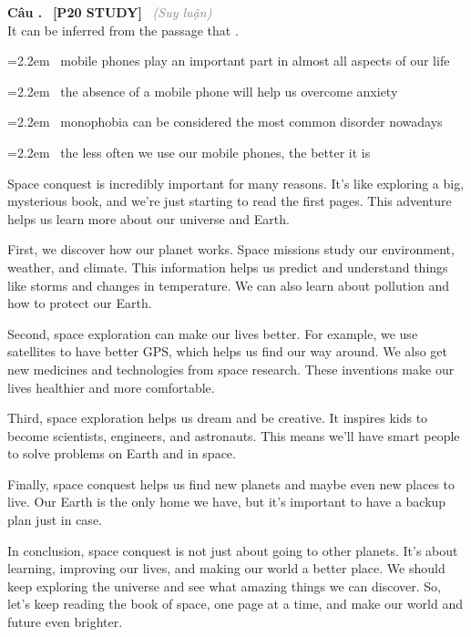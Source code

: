 \documentclass[12pt,a4paper,twoside]{article}
\newcounter{qcounter}
\newcommand{\question}[2][]{%
    \stepcounter{qcounter}%
    \par\vspace{6pt}%
    \noindent\textcolor{primaryBlue}{\textbf{Câu \theqcounter.}}~%
    \textcolor{secondaryBlue}{\small\textbf{[P20 STUDY]}}~%
    \if\relax\detokenize{#1}\relax\else\textcolor{gray}{\small\textit{(#1)}}~\fi\\[1pt]
    \noindent #2%
}
\newcommand{\choiceitem}[2]{%
    \tikz[baseline=-0.5ex]{%
        \node[draw=primaryBlue, circle, minimum size=1.5em, inner sep=0pt, thick] {\textbf{#1}};%
    }~#2%
}
\newenvironment{readingpassage}[1][]{%
    \begin{tcolorbox}[enhanced, colback=grayLight, colframe=secondaryBlue,
        coltitle=textDark, fonttitle=\bfseries, title={#1},
        rounded corners, arc=3mm, boxrule=1pt,
        left=15pt, right=15pt, top=10pt, bottom=10pt,
        breakable, before skip=10pt, after skip=10pt, drop fuzzy shadow]
    \setstretch{1.3}
}{\end{tcolorbox}}
\begin{document}
\question[Suy luận]{It can be inferred from the passage that \underline{\hspace{1.3cm}}.}

\par\vspace{4pt}
\noindent\hangindent=2.2em\choiceitem{A}{mobile phones play an important part in almost all aspects of our life}\par\vspace{4pt}
\noindent\hangindent=2.2em\choiceitem{B}{the absence of a mobile phone will help us overcome anxiety}\par\vspace{4pt}
\noindent\hangindent=2.2em\choiceitem{C}{monophobia can be considered the most common disorder nowadays}\par\vspace{4pt}
\noindent\hangindent=2.2em\choiceitem{D}{the less often we use our mobile phones, the better it is}\par\vspace{4pt}

\begin{readingpassage}[]
Space conquest is incredibly important for many reasons. It's like exploring a big, mysterious book, and we're just starting to read the first pages. This adventure helps us learn more about our universe and Earth.

First, we discover how our planet works. Space missions study our environment, weather, and climate. This information helps us predict and understand things like storms and changes in temperature. We can also learn about pollution and how to protect our Earth.

Second, space exploration can make our lives better. For example, we use satellites to have better GPS, which helps us find our way around. We also get new medicines and technologies from space research. These inventions make our lives healthier and more comfortable.

Third, space exploration helps us dream and be creative. It inspires kids to become scientists, engineers, and astronauts. This means we’ll have smart people to solve problems on Earth and in space.

Finally, space conquest helps us find new planets and maybe even new places to live. Our Earth is the only home we have, but it’s important to have a backup plan just in case.

In conclusion, space conquest is not just about going to other planets. It’s about learning, improving our lives, and making our world a better place. We should keep exploring the universe and see what amazing things we can discover. So, let's keep reading the book of space, one page at a time, and make our world and future even brighter.
\end{readingpassage}
\end{document}
